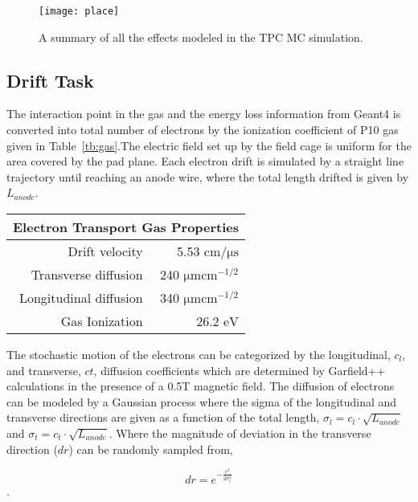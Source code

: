 \begin{figure}
\texttt{[image: place]}
\caption{A summary of all the effects modeled in the TPC MC simulation.}
\label{fig:place}
\end{figure}

\subsection{Drift Task}
The interaction point in the gas and the energy loss information from Geant4 is converted into total number of electrons by the ionization coefficient of P10 gas given in Table~\ref{tb:gas}.The electric field set up by the field cage is uniform for the area covered by the pad plane. Each electron drift is simulated by a straight line trajectory until reaching an anode wire, where the total length drifted is given by $L_{anode}$.


\begin{table*}\centering
{}
\begin{tabular}{@{}rr@{}}\toprule 
\multicolumn{2}{c}{Electron Transport Gas Properties} \\
 \midrule
Drift velocity & 5.53 $\si{\centi\meter\per\micro\second}$\\
Transverse diffusion & 240 $\si{\micro \meter \centi\meter}^{-1/2}$\\
Longitudinal diffusion &  340 $\si{\micro \meter \centi\meter}^{-1/2}$\\
Gas Ionization & 26.2 $\si{\eV}$\\
\bottomrule
\end{tabular}
\caption{An overview of the properties of the TPC}
\label{tb:gas}
\end{table*}


The stochastic motion of the electrons can be categorized by the longitudinal, $c_{l}$, and transverse, $c{t}$, diffusion coefficients which are determined by Garfield++ calculations in the presence of a 0.5T magnetic field. The diffusion of electrons can be modeled by a Gaussian process where the sigma of the longitudinal and transverse directions are given as a function of the total length, $\sigma_{l}=c_{l}\cdot\sqrt{L_{anode}}$ and $\sigma_{t}=c_{t}\cdot\sqrt{L_{anode}}$. Where the magnitude of deviation in the transverse direction ($dr$) can be randomly sampled from,

\begin{equation}
dr = e^{-\frac{r^2}{2\sigma_{t}^2}}
\end{equation}. 

